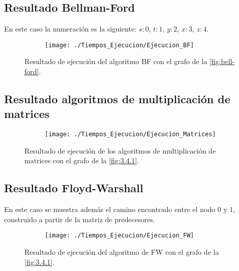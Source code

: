 \subsection{Resultado Bellman-Ford}

En este caso la numeración es la siguiente: $s:0$, $t:1$, $y:2$, $x:3$, $z:4$.

\begin{figure}[!htb]
	\centering
	\begin{subfigure}{\linewidth}
		\texttt{[image: ./Tiempos\_Ejecucion/Ejecucion\_BF]}
	\end{subfigure}
	
	\caption{Resultado de ejecución del algoritmo BF con el grafo de la \autoref{fig:bell-ford}.}
	\label{fig:resultado_BF}
\end{figure}

\subsection{Resultado algoritmos de multiplicación de matrices}

\begin{figure}[!htb]
	\centering
	\begin{subfigure}{\linewidth}
		\texttt{[image: ./Tiempos\_Ejecucion/Ejecucion\_Matrices]}
	\end{subfigure}
	
	\caption{Resultado de ejecución de los algoritmos de multiplicación de matrices con el grafo de la \autoref{fig:3.4.1}.}
	\label{fig:resultado_Matrices}
\end{figure}

\newpage

\subsection{Resultado Floyd-Warshall}

En este caso se muestra además el camino encontrado entre el nodo $0$ y $1$, construido a partir de la matriz de predecesores.

\begin{figure}[!htb]
	\centering
	\begin{subfigure}{\linewidth}
		\texttt{[image: ./Tiempos\_Ejecucion/Ejecucion\_FW]}
	\end{subfigure}
	
	\caption{Resultado de ejecución del algoritmo de FW con el grafo de la \autoref{fig:3.4.1}.}
	\label{fig:resultado_FW}
\end{figure}

